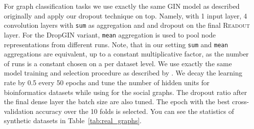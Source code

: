 \documentclass{article}
\begin{document}
\begin{table*}[ht]
\centering
{}
\caption{Synthetic dataset statistics and properties.}  
\label{tab:synthetic_graphs}
\end{table*} 

For graph classification tasks we use exactly the same GIN model as described originally and apply our dropout technique on top. Namely, with 1 input layer, 4 convolution layers with \texttt{sum} as aggregation and  and dropout \citep{srivastava2014dropout} on the final \textsc{Readout} layer. For the DropGIN variant, \texttt{mean} aggregation is used to pool node representations from different runs. Note, that in our setting \texttt{sum} and \texttt{mean} aggregations are equivalent, up to a constant multiplicative factor, as the number of runs is a constant chosen on a per dataset level. We use exactly the same model training and selection procedure as described by \citep{GIN}. We decay the learning rate by 0.5 every 50 epochs and tune the number of hidden units  for bioinformatics datasets while using  for the social graphs. The dropout ratio  after the final dense layer the batch size  are also tuned. The epoch with the best cross-validation accuracy over the 10 folds is selected. You can see the statistics of synthetic datasets in Table~\ref{tab:real_graphs}. 
\end{document}

